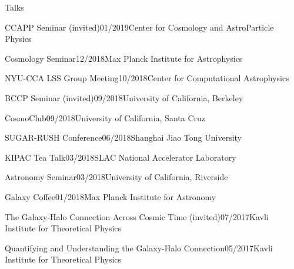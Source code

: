 \documentclass[11pt]{resume} %
\begin{document}
\begin{rSection}{Talks}
  \begin{adjustwidth}{0.5cm}{}

    \begin{rSubsection}{CCAPP Seminar (invited)}{01/2019}{Center for Cosmology and AstroParticle Physics}{}\end{rSubsection}

    \begin{rSubsection}{Cosmology Seminar}{12/2018}{Max Planck Institute for Astrophysics}{}\end{rSubsection}

    \begin{rSubsection}{NYU-CCA LSS Group Meeting}{10/2018}{Center for Computational Astrophysics}{}\end{rSubsection}

    \begin{rSubsection}{BCCP Seminar (invited)}{09/2018}{University of California, Berkeley}{}\end{rSubsection}

    \begin{rSubsection}{CosmoClub}{09/2018}{University of California, Santa Cruz}{}\end{rSubsection}

    \begin{rSubsection}{SUGAR-RUSH Conference}{06/2018}{Shanghai Jiao Tong University}{}\end{rSubsection}

    \begin{rSubsection}{KIPAC Tea Talk}{03/2018}{SLAC National Accelerator Laboratory}{}\end{rSubsection}

    \begin{rSubsection}{Astronomy Seminar}{03/2018}{University of California, Riverside}{}\end{rSubsection}

    \begin{rSubsection}{Galaxy Coffee}{01/2018}{Max Planck Institute for Astronomy}{}\end{rSubsection}

    \begin{rSubsection}{The Galaxy-Halo Connection Across Cosmic Time (invited)}{07/2017}{Kavli Institute for Theoretical Physics}{}\end{rSubsection}

    \begin{rSubsection}{Quantifying and Understanding the Galaxy-Halo Connection}{05/2017}{Kavli Institute for Theoretical Physics}{}\end{rSubsection}


\end{adjustwidth}
\end{rSection}
\end{document}
